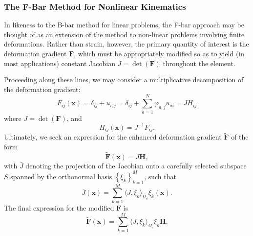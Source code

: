 \subsubsection{The F-Bar Method for Nonlinear Kinematics}

In likeness to the B-bar method for linear problems, the F-bar approach may be thought of as an extension of the method to non-linear problems involving finite deformations. Rather than strain, however, the primary quantity of interest is the deformation gradient $\mathbf{F}$, which must be appropriately modified so as to yield (in most applications) constant Jacobian $J = \det (\mathbf{F})$ throughout the element.

Proceeding along these lines, we may consider a multiplicative decomposition of the deformation gradient:
\begin{equation}
  F_{ij} (\mathbf{x}) = \delta_{ij} + u_{i,j} = \delta_{ij} + \sum_{a=1}^N \varphi_{a,j} u_{ai} = J H_{ij}
\end{equation}
where $J = \det (\mathbf{F})$, and
\begin{equation}
  H_{ij} (\mathbf{x}) = J^{-1} F_{ij}.
\end{equation}
Ultimately, we seek an expression for the enhanced deformation gradient $\tilde{\mathbf{F}}$ of the form
\begin{equation}
  \tilde{\mathbf{F}} (\mathbf{x}) = \bar{J} \mathbf{H},
\end{equation}
with $\bar{J}$ denoting the projection of the Jacobian onto a carefully selected subspace $S$ spanned by the orthonormal basis $\left\{ \xi_k \right\}_{k = 1}^M$, such that
\begin{equation}
  \bar{J} (\mathbf{x}) = \sum_{k=1}^M \langle J, \xi_k \rangle_{\Omega_e} \xi_k (\mathbf{x}).
\end{equation}
The final expression for the modified $\tilde{\mathbf{F}}$ is
\begin{equation}
  \tilde{\mathbf{F}} (\mathbf{x}) = \sum_{k=1}^M \langle J, \xi_k \rangle_{\Omega_e} \xi_k \mathbf{H}.
\end{equation}

